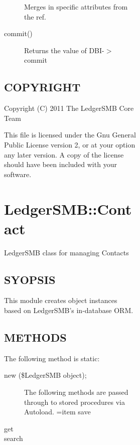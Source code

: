 \begin{description}
\begin{description}
\begin{description}
\begin{description}
\begin{description}
\begin{description}
\begin{description}
Merges in specific attributes from the ref.


\item[{commit()}] \mbox{}

Returns the value of DBI-$>$commit

\end{description}
\subsection*{COPYRIGHT\label{LedgerSMB::File_COPYRIGHT}}


Copyright (C) 2011 The LedgerSMB Core Team



This file is licensed under the Gnu General Public License version 2, or at your
option any later version.  A copy of the license should have been included with
your software.

\section{LedgerSMB::Contact\label{LedgerSMB::Contact}}


LedgerSMB class for managing Contacts

\subsection*{SYOPSIS\label{LedgerSMB::Contact_SYOPSIS}}


This module creates object instances based on LedgerSMB's in-database ORM.

\subsection*{METHODS\label{LedgerSMB::Contact_METHODS}}


The following method is static:

\begin{description}

\item[{new (\$LedgerSMB object);}] \mbox{}

The following methods are passed through to stored procedures via Autoload.
=item save


\item[{get}] \mbox{}
\item[{search}] \mbox{}


\end{description}
\end{description}
\end{description}
\end{description}
\end{description}
\end{description}
\end{description}
